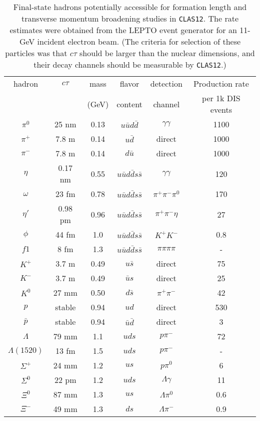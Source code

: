 \begin{table}[htbp]
\begin{center}
\begin{tabular}{||c|c|c|c|c|c||} \hline \hline
hadron & $c\tau$ & mass & flavor  & detection & Production rate\\
       &         &(GeV) & content &  channel &  per 1k DIS events\\ \hline \hline
$\pi^0$ & 25 nm & 0.13 & $u\bar{u}d\bar{d}$ & $\gamma\gamma$ & 1100 \\ \hline
$\pi^+$ & 7.8 m & 0.14 &   $u\bar{d}$ & direct & 1000 \\ \hline
$\pi^-$ & 7.8 m & 0.14 &   $d\bar{u}$  & direct & 1000 \\ \hline
$\eta$ & 0.17 nm & 0.55 & $u\bar{u}d\bar{d}s\bar{s}$&$\gamma\gamma$ & 120 \\ \hline
$\omega$ & 23 fm & 0.78 &  $u\bar{u}d\bar{d}s\bar{s}$ & $\pi^+\pi^-\pi^0$ & 170 \\ \hline
$\eta'$ & 0.98 pm & 0.96 &  $u\bar{u}d\bar{d}s\bar{s}$ & $\pi^+\pi^-\eta$ & 27 \\ \hline
$\phi$ & 44 fm & 1.0 &  $u\bar{u}d\bar{d}s\bar{s}$ & $K^+K^-$ & 0.8 \\ \hline
$f1$ & 8 fm & 1.3 &  $u\bar{u}d\bar{d}s\bar{s}$ & $\pi\pi\pi\pi$ & - \\ \hline
$K^+$ & 3.7 m & 0.49 &  $u\bar{s}$ & direct & 75 \\ \hline
$K^-$ & 3.7 m & 0.49 &  $\bar{u}s$ & direct & 25 \\ \hline
$K^0$ & 27 mm & 0.50 &  $d\bar{s}$ & $\pi^+\pi^-$ & 42 \\ \hline
$p$ & stable & 0.94 &  $ud$ & direct & 530 \\ \hline
$\bar{p}$ & stable & 0.94 &  $\bar{u}\bar{d}$ & direct & 3 \\ \hline
$\Lambda$ & 79 mm & 1.1 &  $uds$ & $p\pi^-$ & 72 \\ \hline
$\Lambda(1520)$ & 13 fm & 1.5 &  $uds$ & $p\pi^-$ & - \\ \hline
$\Sigma^+$ & 24 mm & 1.2 &  $us$ & $p\pi^0$ & 6 \\ \hline
$\Sigma^0$ & 22 pm & 1.2 &  $uds$ & $\Lambda\gamma$ & 11 \\ \hline
$\Xi^0$ & 87 mm & 1.3 &  $us$ & $\Lambda\pi^0$ & 0.6 \\ \hline
$\Xi^-$ & 49 mm & 1.3 &  $ds$ & $\Lambda\pi^-$ & 0.9 \\ \hline \hline	
\end{tabular}
\end{center}
\caption{\small{Final-state hadrons potentially accessible for formation 
length and transverse momentum broadening studies in {\tt CLAS12}. The 
rate estimates were obtained from the LEPTO event generator for an 11-GeV 
incident electron beam. (The criteria for selection of these particles 
was that $c\tau$ should be larger than the nuclear dimensions, and their 
decay channels should be measurable by {\tt CLAS12}.)}}
\label{table:hadron_list}  
\end{table}

